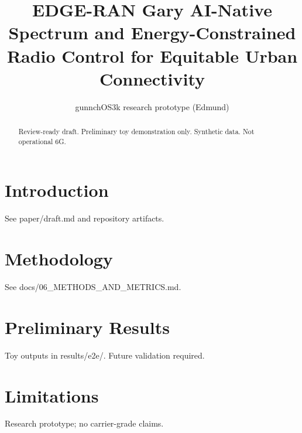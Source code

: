 \documentclass{article}
\title{EDGE-RAN Gary AI-Native Spectrum and Energy-Constrained Radio Control for Equitable Urban Connectivity}
\author{gunnchOS3k research prototype (Edmund)}
\begin{document}
\maketitle
\begin{abstract}
Review-ready draft. Preliminary toy demonstration only. Synthetic data. Not operational 6G.
\end{abstract}
\section{Introduction}
See paper/draft.md and repository artifacts.
\section{Methodology}
See docs/06\_METHODS\_AND\_METRICS.md.
\section{Preliminary Results}
Toy outputs in results/e2e/. Future validation required.
\section{Limitations}
Research prototype; no carrier-grade claims.


\end{document}
